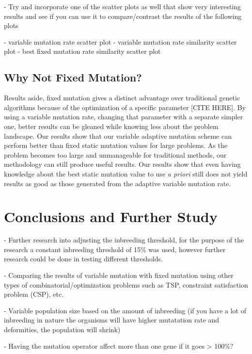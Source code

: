 \documentclass{sig-alternate}
\begin{document}
- Try and incorporate one of the scatter plots as well that show very interesting
  results and see if you can use it to compare/contrast the results of the 
  following plots
  
    - variable mutation rate scatter plot
    - variable mutation rate similarity scatter plot
    - best fixed mutation rate similarity scatter plot

\subsection{Why Not Fixed Mutation?}
Results aside, fixed mutation gives a distinct advantage over traditional genetic algorithms because of the optimization of a specific parameter [CITE HERE]. By using a variable mutation rate, changing that parameter with a separate simpler one, better results can be gleaned while knowing less about the problem landscape. Our results show that our variable adaptive mutation scheme can perform better than fixed static mutation values for large problems. As the problem becomes too large and unmanageable for traditional methods, our methodology can still produce useful results. Our results show that even having knowledge about the best static mutation value to use \emph{a priori} still does not yield results as good as those generated from the adaptive variable mutation rate.


% 
%
\section{Conclusions and Further Study}

- Further research into adjusting the inbreeding threshold, for the purpose
  of the research a constant inbreeding threshold of 15\% was used, however
  further research could be done in testing different thresholds.

- Comparing the results of variable mutation with fixed mutation using other
  types of combinatorial/optimization problems such as TSP, constraint
  satisfaction problem (CSP), etc.

- Variable population size based on the amount of inbreeding (if you have
  a lot of inbreeding in nature the organisms will have higher mutatation
  rate and deformities, the population will shrink)

- Having the mutation operator affect more than one gene if it goes > 100\%? 
\end{document}
